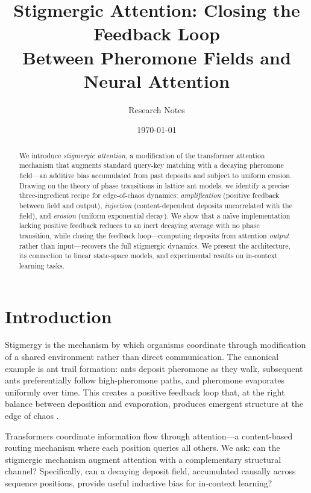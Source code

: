 \documentclass[11pt,a4paper]{article}
\title{Stigmergic Attention: Closing the Feedback Loop\\
Between Pheromone Fields and Neural Attention}
\author{Research Notes}
\date{\today}
\begin{document}
\maketitle

\begin{abstract}
We introduce \emph{stigmergic attention}, a modification of the transformer
attention mechanism that augments standard query-key matching with a
decaying pheromone field---an additive bias accumulated from past deposits
and subject to uniform erosion. Drawing on the theory of phase transitions
in lattice ant models, we identify a precise three-ingredient recipe for
edge-of-chaos dynamics: \emph{amplification} (positive feedback between
field and output), \emph{injection} (content-dependent deposits uncorrelated
with the field), and \emph{erosion} (uniform exponential decay). We show
that a na\"ive implementation lacking positive feedback reduces to an inert
decaying average with no phase transition, while closing the feedback
loop---computing deposits from attention \emph{output} rather than
input---recovers the full stigmergic dynamics. We present the architecture,
its connection to linear state-space models, and experimental results on
in-context learning tasks.
\end{abstract}

\section{Introduction}
\label{sec:intro}

Stigmergy is the mechanism by which organisms coordinate through
modification of a shared environment rather than direct communication.
The canonical example is ant trail formation: ants deposit pheromone
as they walk, subsequent ants preferentially follow high-pheromone
paths, and pheromone evaporates uniformly over time. This creates a
positive feedback loop that, at the right balance between deposition
and evaporation, produces emergent structure at the edge of chaos
\cite{antpaper}.

Transformers \cite{vaswani2017attention} coordinate information flow
through attention---a content-based routing mechanism where each
position queries all others. We ask: can the stigmergic mechanism
augment attention with a complementary structural channel? Specifically,
can a decaying deposit field, accumulated causally across sequence
positions, provide useful inductive bias for in-context learning?
\end{document}
